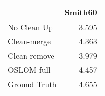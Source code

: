 \begin{tabular}{lr}
\toprule
{} & Smith60 \\
\midrule
No Clean Up  &   3.595 \\
Clean-merge  &   4.363 \\
Clean-remove &   3.979 \\
OSLOM-full   &   4.457 \\
Ground Truth &   4.655 \\
\bottomrule
\end{tabular}
